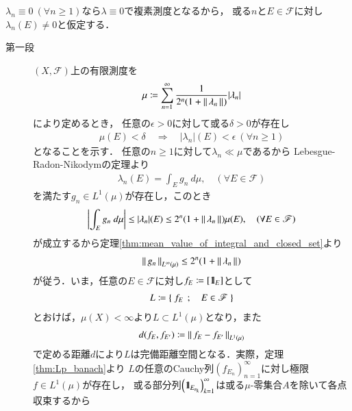 	\begin{prf}$\lambda_n \equiv 0\ (\forall n \geq 1)$なら$\lambda \equiv 0$で複素測度となるから，
		或る$n$と$E \in \mathscr{F}$に対し$\lambda_n(E) \neq 0$と仮定する．
		\begin{description}
			\item[第一段] $(X,\mathscr{F})$上の有限測度を
				\begin{align}
					\mu \coloneqq \sum_{n=1}^\infty \frac{1}{2^n(1 + \left\|\, \lambda_n\, \right\|_{})} |\lambda_n|
				\end{align}
				により定めるとき，%
				任意の$\epsilon > 0$に対して或る$\delta > 0$が存在し
				\begin{align}
					\mu(E) < \delta \quad \Rightarrow \quad |\lambda_n|(E) < \epsilon\ (\forall n \geq 1)
					\label{eq:thm_Vitali_Hahn_Saks_2}
				\end{align}
				となることを示す．
				任意の$n \geq 1$に対して$\lambda_n \ll \mu$であるから
				Lebesgue-Radon-Nikodymの定理より
				\begin{align}
					\lambda_n(E) = \int_E g_n\ d\mu,
					\quad (\forall E \in \mathscr{F})
				\end{align}
				を満たす$g_n \in L^1(\mu)$が存在し，このとき
				\begin{align}
					\left| \int_E g_n\ d\mu \right|
					\leq |\lambda_n|(E)
					\leq 2^n(1+\left\|\, \lambda_n\, \right\|_{})\mu(E),
					\quad (\forall E \in \mathscr{F})
				\end{align}
				が成立するから定理\ref{thm:mean_value_of_integral_and_closed_set}より
				\begin{align}
					\left\|\, g_n\, \right\|_{L^\infty(\mu)} \leq 2^n(1+\left\|\, \lambda_n\, \right\|_{})
				\end{align}
				が従う．いま，任意の$E \in \mathscr{F}$に対し$f_E \coloneqq [\mbox{1}\hspace{-0.25em}\mbox{l}_E]$として
				\begin{align}
					L \coloneqq \left\{\ f_E\ \, ; \quad E \in \mathscr{F}\ \right\}
				\end{align}
				とおけば，$\mu(X) < \infty$より$L \subset L^1(\mu)$となり，また
				\begin{align}
					d(f_E,f_{E'}) \coloneqq \left\|\, f_E - f_{E'}\, \right\|_{L^1(\mu)}
				\end{align}
				で定める距離$d$により$L$は完備距離空間となる．実際，定理\ref{thm:Lp_banach}より
				$L$の任意のCauchy列$\left(f_{E_n}\right)_{n=1}^\infty$に対し極限$f \in L^1(\mu)$が存在し，
				或る部分列$\left(\mbox{1}\hspace{-0.25em}\mbox{l}_{E_{n_k}}\right)_{k=1}^\infty$は或る$\mu$-零集合$A$を除いて各点収束するから
				\begin{align}

\end{align}
\end{description}
\end{prf}
